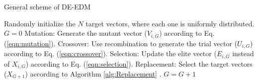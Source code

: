 \begin{algorithm}[t]
  \scriptsize
	\caption{General scheme of DE-EDM} 
	\begin{algorithmic}[1]
	\STATE Randomly initialize the $N$ target vectors, where each one is uniformly distributed.
	\STATE $G=0$
		\STATE Mutation: Generate the mutant vector ($V_{i,G}$) according to Eq. (\ref{eqn:mutation}).
		\STATE Crossover: Use recombination to generate the trial vector ($U_{i,G}$) according to Eq. (\ref{eqn:crossover}).
		\STATE Selection: Update the elite vector ($E_{i,G}$ instead of $X_{i,G}$) according to Eq. (\ref{eqn:selection}).
	   \ENDFOR
		\STATE Replacement: Select the target vectors ($X_{G+1}$) according to Algorithm \ref{alg:Replacement} .
	   \STATE $G=G+1$
	\ENDWHILE
\end{algorithmic}
    \label{alg:DEEDM}
\end{algorithm}

%
%
%
%
%
%
%
%
%

